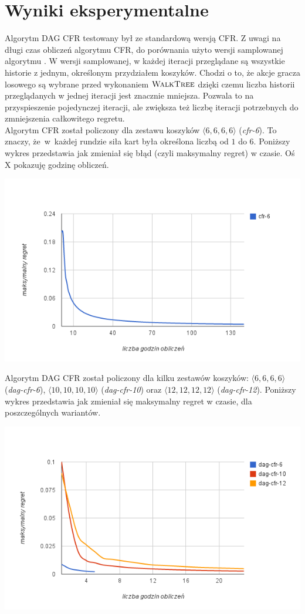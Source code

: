 \documentclass[magisterska]{pracamgr}
\begin{document}
\chapter{Wyniki eksperymentalne}

\noindent
Algorytm DAG CFR testowany był ze standardową wersją CFR. Z uwagi na długi czas obliczeń
algorytmu CFR, do porównania użyto wersji samplowanej algorytmu \cite{cfr}. W wersji samplowanej,
w każdej iteracji przeglądane są wszystkie historie z jednym, określonym przydziałem koszyków.
Chodzi o to, że akcje gracza losowego są wybrane przed wykonaniem $\Call{WalkTree}{}$ dzięki czemu
liczba historii przeglądanych w jednej iteracji jest znacznie mniejsza.
Pozwala to na przyspieszenie pojedynczej iteracji, ale zwiększa też liczbę iteracji potrzebnych do
zmniejszenia całkowitego regretu. \\

\noindent
Algorytm CFR został policzony dla zestawu koszyków $\langle6,6,6,6\rangle$ (\emph{cfr-6}). To znaczy, że~w~każdej rundzie
siła kart była określona liczbą od $1$ do $6$. Poniższy wykres przedstawia jak zmieniał się
błąd (czyli maksymalny regret) w czasie. Oś X pokazuję godzinę obliczeń. 

\includegraphics[scale=0.7]{wykres1.png}

\noindent
Algorytm DAG CFR został policzony dla kilku zestawów koszyków: $\langle 6,6,6,6 \rangle$ (\emph{dag-cfr-6}),
$\langle10,10,10,10\rangle$ (\emph{dag-cfr-10}) oraz $\langle12,12,12,12\rangle$ (\emph{dag-cfr-12}).
Poniższy wykres przedstawia jak zmieniał się maksymalny regret w czasie, dla poszczególnych wariantów.

\includegraphics[scale=0.7]{wykres2.png}
\end{document}
